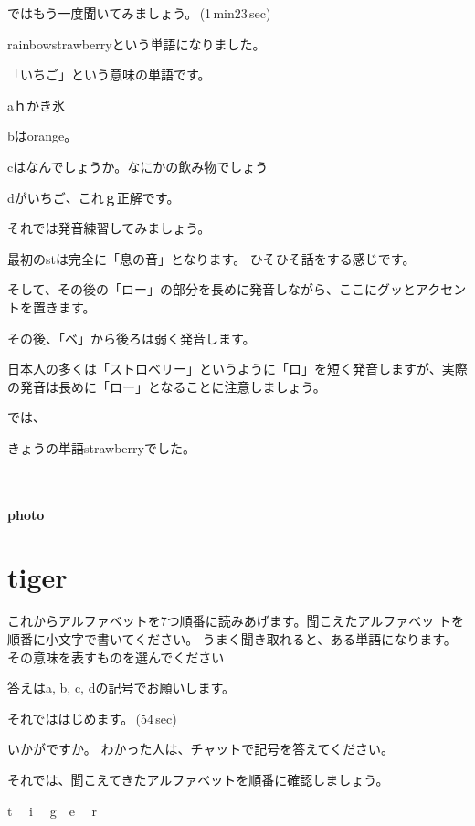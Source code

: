 \documentclass[12pt]{jlreq}
\begin{document}
ではもう一度聞いてみましょう。\faVolumeUp\,(1\,min23\,sec)

rainbowstrawberryという単語になりました。

「いちご」という意味の単語です。

aｈかき氷

bはorange。

cはなんでしょうか。なにかの飲み物でしょう

dがいちご、これｇ正解です。


それでは発音練習してみましょう。

最初のstは完全に「息の音」となります。
ひそひそ話をする感じです。

そして、その後の「ロー」の部分を長めに発音しながら、ここにグッとアクセントを置きます。

その後、「ベ」から後ろは弱く発音します。

日本人の多くは「ストロベリー」というように「ロ」を短く発音しますが、実際の発音は長めに「ロー」となることに注意しましょう。

では、

きょうの単語strawberryでした。

{\large \ComputerMouse}\,\,


\paragraph{photo}


\newpage
\section{tiger}

これからアルファベットを7つ順番に読みあげます。聞こえたアルファベッ
トを順番に小文字で書いてください。
うまく聞き取れると、ある単語になります。
その意味を表すものを選んでください

答えはa, b, c, dの記号でお願いします。

それでははじめます。\faVolumeUp\,(54\,sec)

いかがですか。
わかった人は、チャットで記号を答えてください。

それでは、聞こえてきたアルファベットを順番に確認しましょう。{\large \ComputerMouse}

t\,\,
{\large \ComputerMouse}\,\,
i\,\,
{\large \ComputerMouse}\,\,
g
{\large \ComputerMouse}\,\,
e\,\,
{\large \ComputerMouse}\,\,
r\,\,
\end{document}
